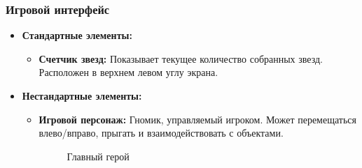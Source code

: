 \documentclass{article}
\begin{document}
\subsubsection{Игровой интерфейс}
\begin{itemize}
    \item \textbf{Стандартные элементы:}
    \begin{itemize}
        \item \textbf{Счетчик звезд:} Показывает текущее количество собранных звезд. Расположен в верхнем левом углу экрана.
    \end{itemize}
    \item \textbf{Нестандартные элементы:}
    \begin{itemize}
        \item \textbf{Игровой персонаж:} Гномик, управляемый игроком. Может перемещаться влево/вправо, прыгать и взаимодействовать с объектами. 

        \begin{figure}[h]
        \caption{Главный герой}
        \label{ris:image}
        \end{figure}


\end{itemize}
\end{itemize}
\end{document}
